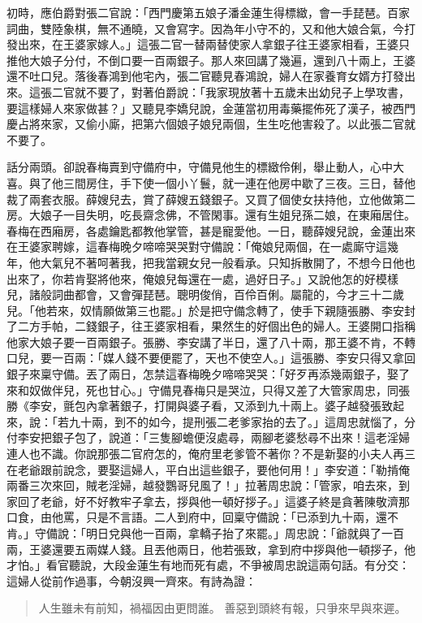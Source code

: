 初時，應伯爵對張二官說：「西門慶第五娘子潘金蓮生得標緻，會一手琵琶。百家詞曲，雙陸象棋，無不通曉，又會寫字。因為年小守不的，又和他大娘合氣，今打發出來，在王婆家嫁人。」這張二官一替兩替使家人拿銀子往王婆家相看，王婆只推他大娘子分付，不倒口要一百兩銀子。那人來回講了幾遍，還到八十兩上，王婆還不吐口兒。落後春鴻到他宅內，張二官聽見春鴻說，婦人在家養育女婿方打發出來。這張二官就不要了，對著伯爵說：「我家現放著十五歲未出幼兒子上學攻書，要這樣婦人來家做甚？」又聽見李嬌兒說，金蓮當初用毒藥擺佈死了漢子，被西門慶占將來家，又偷小廝，把第六個娘子娘兒兩個，生生吃他害殺了。以此張二官就不要了。

話分兩頭。卻說春梅賣到守備府中，守備見他生的標緻伶俐，舉止動人，心中大喜。與了他三間房住，手下使一個小丫鬟，就一連在他房中歇了三夜。三日，替他裁了兩套衣服。薛嫂兒去，賞了薛嫂五錢銀子。又買了個使女扶持他，立他做第二房。大娘子一目失明，吃長齋念佛，不管閑事。還有生姐兒孫二娘，在東廂居住。春梅在西廂房，各處鑰匙都教他掌管，甚是寵愛他。一日，聽薛嫂兒說，金蓮出來在王婆家聘嫁，這春梅晚夕啼啼哭哭對守備說：「俺娘兒兩個，在一處廝守這幾年，他大氣兒不著呵著我，把我當親女兒一般看承。只知拆散開了，不想今日他也出來了，你若肯娶將他來，俺娘兒每還在一處，過好日子。」又說他怎的好模樣兒，諸般詞曲都會，又會彈琵琶。聰明俊俏，百伶百俐。屬龍的，今才三十二歲兒。「他若來，奴情願做第三也罷。」於是把守備念轉了，使手下親隨張勝、李安封了二方手帕，二錢銀子，往王婆家相看，果然生的好個出色的婦人。王婆開口指稱他家大娘子要一百兩銀子。張勝、李安講了半日，還了八十兩，那王婆不肯，不轉口兒，要一百兩：「媒人錢不要便罷了，天也不使空人。」這張勝、李安只得又拿回銀子來稟守備。丟了兩日，怎禁這春梅晚夕啼啼哭哭：「好歹再添幾兩銀子，娶了來和奴做伴兒，死也甘心。」守備見春梅只是哭泣，只得又差了大管家周忠，同張勝《李安，氈包內拿著銀子，打開與婆子看，又添到九十兩上。婆子越發張致起來，說：「若九十兩，到不的如今，提刑張二老爹家抬的去了。」這周忠就惱了，分付李安把銀子包了，說道：「三隻腳蟾便沒處尋，兩腳老婆愁尋不出來！這老淫婦連人也不識。你說那張二官府怎的，俺府里老爹管不著你？不是新娶的小夫人再三在老爺跟前說念，要娶這婦人，平白出這些銀子，要他何用！」李安道：「勒掯俺兩番三次來回，賊老淫婦，越發鸚哥兒風了！」拉著周忠說：「管家，咱去來，到家回了老爺，好不好教牢子拿去，拶與他一頓好拶子。」這婆子終是貪著陳敬濟那口食，由他罵，只是不言語。二人到府中，回稟守備說：「已添到九十兩，還不肯。」守備說：「明日兌與他一百兩，拿轎子抬了來罷。」周忠說：「爺就與了一百兩，王婆還要五兩媒人錢。且丟他兩日，他若張致，拿到府中拶與他一頓拶子，他才怕。」看官聽說，大段金蓮生有地而死有處，不爭被周忠說這兩句話。有分交：這婦人從前作過事，今朝沒興一齊來。有詩為證：
\begin{quote}
人生雖未有前知，禍福因由更問誰。
善惡到頭終有報，只爭來早與來遲。
\end{quote}

